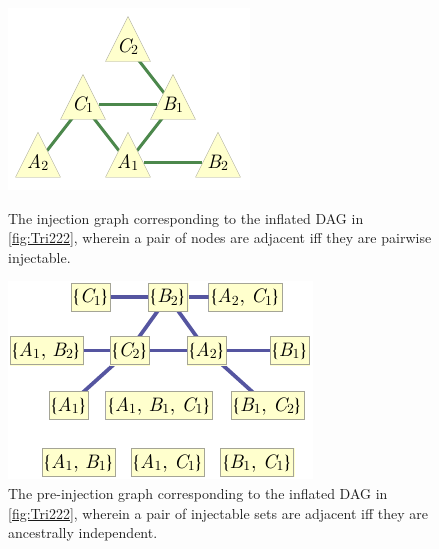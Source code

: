 \begin{figure}[t]
\centering
\begin{minipage}[t]{0.3\linewidth}
\centering
\includegraphics[scale=1]{injectiongraph222.pdf}
\caption{The injection graph corresponding to the inflated DAG in \cref{fig:Tri222}, wherein a pair of nodes are adjacent iff they are pairwise injectable.}\label{fig:injection222}
\end{minipage}
\hfill
\begin{minipage}[t]{0.3\linewidth}
\centering
\includegraphics[scale=1]{preinjectiongraph222.pdf}
\caption{The pre-injection graph corresponding to the inflated DAG in \cref{fig:Tri222}, wherein a pair of injectable sets are adjacent iff they are ancestrally independent. }\label{fig:preinjectiongraph222}
\end{minipage}
\hfill
\begin{minipage}[t]{0.3\linewidth}
\centering

\end{minipage}
\end{figure}
